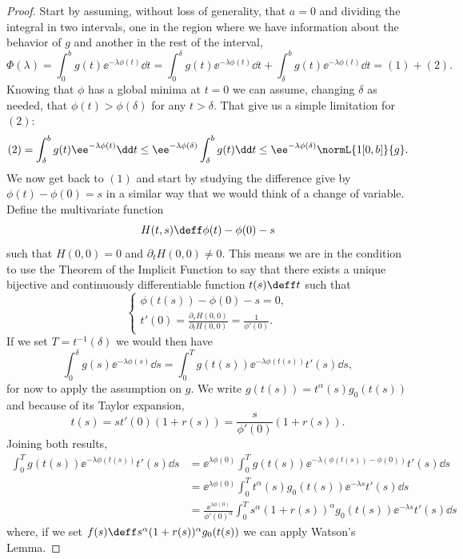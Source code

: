 \begin{proof}
	Start by assuming, without loss of generality, that $a=0$ and dividing the integral in two intervals, one in the region where we have information about the behavior of $g$ and another in the rest of the interval,
	\begin{equation}
		\Phi(\lambda) = \int_{0}^{b} g(t) \ee^{-\lambda \phi(t)} \dd t = \int_{0}^{\delta} g(t) \ee^{-\lambda \phi(t)} \dd t + \int_{\delta}^{b} g(t) \ee^{-\lambda \phi(t)} \dd t = (1) + (2).
	\end{equation}
	Knowing that $\phi$ has a global minima at $t = 0$ we can assume, changing $\delta$ as needed, that $\phi(t) > \phi(\delta)$ for any $t > \delta$. That give us a simple limitation for $(2)$:
	\begin{equation}
		(2) = \int_{\delta}^{b} g(t) \ee^{-\lambda \phi(t)} \dd t \leq \ee^{-\lambda \phi(\delta)} \int_{\delta}^{b} g(t) \dd t \leq \ee^{-\lambda \phi(\delta)} \normL{1[0,b]}{g}.
	\end{equation}
	We now get back to $(1)$ and start by studying the difference give by $\phi(t) - \phi(0) = s$ in a similar way that we would think of a change of variable. Define the multivariate function
	\begin{equation}
		H(t,s) \deff \phi(t) - \phi(0) - s
	\end{equation} 
	such that $H(0,0) = 0$ and $\partial_t H(0,0) \neq 0$. This means we are in the condition to use the Theorem of the Implicit Function to say that there exists a unique bijective and continuously differentiable function $t(s) \deff t$ such that 
	\begin{equation}
		\begin{cases}
			\phi(t(s)) - \phi(0) - s = 0,	\\
			t'(0) = \frac{\partial_s H(0,0)}{\partial_t H(0,0)} = \frac{1}{\phi'(0)}.
		\end{cases}
	\end{equation}
	If we set $T = t^{-1}(\delta)$ we would then have
	\begin{equation}
		\int_{0}^{\delta} g(s) \ee^{-\lambda \phi(s)} \dd s = \int_{0}^{T} g(t(s)) \ee^{-\lambda \phi(t(s))} t'(s) \dd s,
	\end{equation}
	for now to apply the assumption on $g$. We write $g(t(s)) = t^\alpha(s) g_0(t(s))$ and because of its Taylor expansion,
	\begin{equation}
	t(s) = s t'(0) (1+r(s)) = \frac{s}{\phi'(0)}(1+r(s)).		
	\end{equation}
	Joining both results,
		\begin{align}
			\int_{0}^{T} g(t(s)) \ee^{-\lambda \phi(t(s))} t'(s) \dd s & = \ee^{\lambda \phi(0)} \int_{0}^{T} g(t(s)) \ee^{-\lambda (\phi(t(s)) - \phi(0))} t'(s) \dd s \\
			& = \ee^{\lambda \phi(0)} \int_{0}^{T} t^\alpha(s) g_0(t(s)) \ee^{-\lambda s} t'(s) \dd s \\
			& = \frac{\ee^{\lambda \phi(0)}}{\phi'(0)^\alpha} \int_{0}^{T} s^\alpha (1+r(s))^\alpha g_0(t(s)) \ee^{-\lambda s} t'(s) \dd s			
		\end{align}
	where, if we set $f(s) \deff s^\alpha (1+r(s))^\alpha g_0(t(s))$ we can apply Watson's Lemma.
\end{proof}

